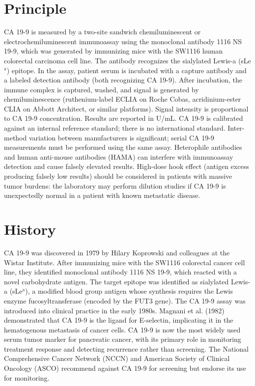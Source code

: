 \section*{Principle}
CA 19-9 is measured by a two-site sandwich chemiluminescent or electrochemiluminescent immunoassay using the monoclonal antibody 1116 NS 19-9, which was generated by immunizing mice with the SW1116 human colorectal carcinoma cell line. The antibody recognizes the sialylated Lewis-a (sLe$^\text{a}$) epitope. In the assay, patient serum is incubated with a capture antibody and a labeled detection antibody (both recognizing CA 19-9). After incubation, the immune complex is captured, washed, and signal is generated by chemiluminescence (ruthenium-label ECLIA on Roche Cobas, acridinium-ester CLIA on Abbott Architect, or similar platforms). Signal intensity is proportional to CA 19-9 concentration. Results are reported in U/mL. CA 19-9 is calibrated against an internal reference standard; there is no international standard. Inter-method variation between manufacturers is significant; serial CA 19-9 measurements must be performed using the same assay. Heterophile antibodies and human anti-mouse antibodies (HAMA) can interfere with immunoassay detection and cause falsely elevated results. High-dose hook effect (antigen excess producing falsely low results) should be considered in patients with massive tumor burdens: the laboratory may perform dilution studies if CA 19-9 is unexpectedly normal in a patient with known metastatic disease.

\section*{History}
CA 19-9 was discovered in 1979 by Hilary Koprowski and colleagues at the Wistar Institute. After immunizing mice with the SW1116 colorectal cancer cell line, they identified monoclonal antibody 1116 NS 19-9, which reacted with a novel carbohydrate antigen. The target epitope was identified as sialylated Lewis-a (sLe$^\text{a}$), a modified blood group antigen whose synthesis requires the Lewis enzyme fucosyltransferase (encoded by the FUT3 gene). The CA 19-9 assay was introduced into clinical practice in the early 1980s. Magnani et al. (1982) demonstrated that CA 19-9 is the ligand for E-selectin, implicating it in the hematogenous metastasis of cancer cells. CA 19-9 is now the most widely used serum tumor marker for pancreatic cancer, with its primary role in monitoring treatment response and detecting recurrence rather than screening. The National Comprehensive Cancer Network (NCCN) and American Society of Clinical Oncology (ASCO) recommend against CA 19-9 for screening but endorse its use for monitoring.

